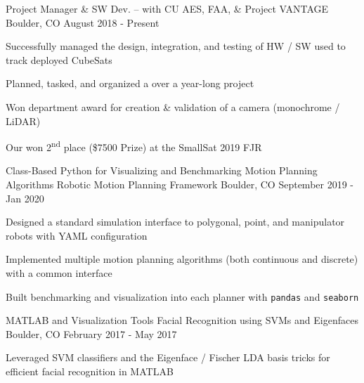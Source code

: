 \begin{cventries}
\cventry
    {Project Manager \& SW Dev. --  with CU AES, FAA, \& }
    {Project VANTAGE}
    {Boulder, CO}
    {August 2018 - Present}
    {
     \begin{cvitems}
      \item{Successfully managed the design, integration, and testing of HW / SW used to track deployed CubeSats}
      \item{Planned, tasked, and organized a  over a year-long project}
      \item{Won department award for creation \& validation of a camera (monochrome / LiDAR) }
      \item{Our
       won 2\textsuperscript{nd} place (\$7500 Prize) at the SmallSat 2019 FJR }
     \end{cvitems}
    }
    
  \cventry
  	{Class-Based Python  for Visualizing and Benchmarking Motion Planning Algorithms }
    {Robotic Motion Planning Framework}
    {Boulder, CO}
    {September 2019 - Jan 2020}
    {
      \begin{cvitems}
        \item{Designed a standard simulation interface to polygonal, point, and manipulator robots with YAML configuration}
        \item{Implemented multiple motion planning algorithms (both continuous and discrete) with a common interface}
        \item {Built benchmarking and visualization into each planner with \texttt{pandas} and \texttt{seaborn}}
      \end{cvitems}
    }

  \cventry
    {MATLAB  and Visualization Tools}
    {Facial Recognition using SVMs and Eigenfaces}
    {Boulder, CO}
    {February 2017 - May 2017}
    {
      \begin{cvitems}
        \item {Leveraged SVM classifiers and the Eigenface / Fischer LDA basis tricks for efficient facial recognition in MATLAB}
      \end{cvitems}
    }
\end{cventries}
